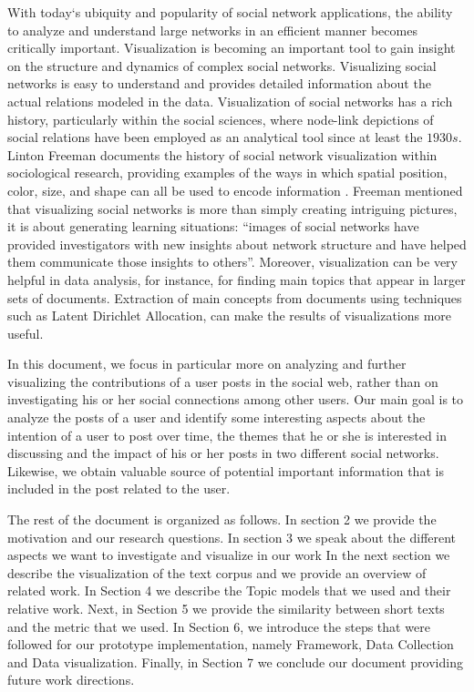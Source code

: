 With today‘s ubiquity and popularity of social network applications, the ability to analyze and understand large networks in an efficient manner becomes
critically important. Visualization is becoming an important tool to gain insight on the structure and dynamics of complex social networks. Visualizing social networks is easy to understand and provides detailed information
about the actual relations modeled in the data. Visualization of social networks has a rich history, particularly within the social sciences, where node-link depictions of social relations have been employed as an analytical tool since at least the $1930s$. Linton Freeman documents the history of social network visualization within sociological research, providing examples of the ways in which spatial position, color, size, and shape can all be used to encode information \cite{freeman}. Freeman mentioned that visualizing social networks
is more than simply creating intriguing pictures, it is about generating
learning situations: “images of social networks have provided investigators with new insights about network structure and have helped them communicate those
insights to others”. Moreover, visualization can be very helpful in data analysis, for instance, for finding main topics that appear in larger sets of documents. Extraction of main concepts from documents using techniques such as Latent Dirichlet Allocation, can make the results of visualizations more useful. 


In this document, we focus in particular more on analyzing and further visualizing the contributions of a user posts in the social web, rather than on investigating his or her social connections among other users. Our main goal is to analyze the posts of a user and identify some interesting aspects about the intention of a user to post over time, the themes that he or she is interested in discussing and the impact of his or her posts in two different social networks. Likewise, we obtain valuable source of potential important information that is included in the post related to the user.


The rest of the document is organized as follows. In section 2 we provide the motivation and our research questions. In section 3 we speak about the different aspects we want to investigate and visualize in our work
In the next section we describe the visualization of the text corpus and we provide an overview of related work. In Section 4 we describe the Topic models that we used and their relative work. Next, in Section 5 we provide the similarity between short texts and the metric that we used. In Section 6, we introduce the steps that were followed for our prototype implementation, namely Framework, Data Collection and Data visualization. Finally, in Section 7 we conclude our document providing future work directions.


